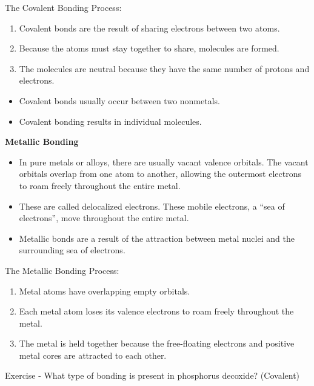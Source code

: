 \documentclass[../hchem.tex]{subfiles}
\begin{document}
The Covalent Bonding Process:
\begin{enumerate}
    \item Covalent bonds are the result of sharing electrons between two atoms.
    \item Because the atoms must stay together to share, molecules are formed.
    \item The molecules are neutral because they have the same number of protons and electrons.
\end{enumerate}

\begin{itemize}
    \item Covalent bonds usually occur between two nonmetals.
    \item Covalent bonding results in individual molecules.
\end{itemize}

\textbf{Metallic Bonding}
\begin{itemize}
    \item In pure metals or alloys, there are usually vacant valence orbitals. The vacant orbitals overlap from one atom to another, allowing the outermost electrons to roam freely throughout the entire metal.
    \item These are called delocalized electrons. These mobile electrons, a ``sea of electrons'', move throughout the entire metal.
    \item Metallic bonds are a result of the attraction between metal nuclei and the surrounding sea of electrons.
\end{itemize}

The Metallic Bonding Process:
\begin{enumerate}
    \item Metal atoms have overlapping empty orbitals.
    \item Each metal atom loses its valence electrons to roam freely throughout the metal.
    \item The metal is held together because the free-floating electrons and positive metal cores are attracted to each other.
\end{enumerate}

Exercise - What type of bonding is present in phosphorus decoxide? (Covalent)
\end{document}
